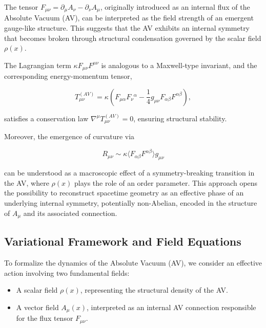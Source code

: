 \documentclass[twoside]{article}
\theoremstyle{definition}
\theoremstyle{remark}
\numberwithin{equation}{section}
\theoremstyle{definition}
\theoremstyle{example}
\theoremstyle{remark}
\numberwithin{equation}{section}%
\begin{document}
The tensor \( F_{\mu\nu} = \partial_\mu A_\nu - \partial_\nu A_\mu \), originally introduced as an internal flux of the Absolute Vacuum (AV), can be interpreted as the field strength of an emergent gauge-like structure. This suggests that the AV exhibits an internal symmetry that becomes broken through structural condensation governed by the scalar field \( \rho(x) \).

The Lagrangian term \( \kappa F_{\mu\nu} F^{\mu\nu} \) is analogous to a Maxwell-type invariant, and the corresponding energy-momentum tensor,

\begin{equation}
T_{\mu\nu}^{(AV)} = \kappa \left( F_{\mu\alpha}F_\nu{}^\alpha - \frac{1}{4}g_{\mu\nu} F_{\alpha\beta}F^{\alpha\beta} \right),
\end{equation}

satisfies a conservation law \( \nabla^\mu T_{\mu\nu}^{(AV)} = 0 \), ensuring structural stability.

Moreover, the emergence of curvature via

\begin{equation}
R_{\mu\nu} \sim \kappa \langle F_{\alpha\beta}F^{\alpha\beta} \rangle g_{\mu\nu}
\end{equation}

can be understood as a macroscopic effect of a symmetry-breaking transition in the AV, where \( \rho(x) \) plays the role of an order parameter. This approach opens the possibility to reconstruct spacetime geometry as an effective phase of an underlying internal symmetry, potentially non-Abelian, encoded in the structure of \( A_\mu \) and its associated connection.


\subsection*{Variational Framework and Field Equations}

To formalize the dynamics of the Absolute Vacuum (AV), we consider an effective action involving two fundamental fields:

\begin{itemize}
	\item A scalar field \( \rho(x) \), representing the structural density of the AV.
	\item A vector field \( A_\mu(x) \), interpreted as an internal AV connection responsible for the flux tensor \( F_{\mu\nu} \).
\end{itemize}
\end{document}
